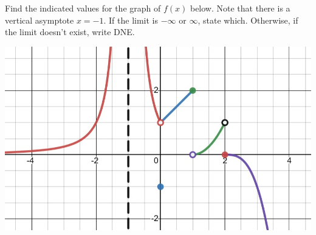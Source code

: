 \documentclass[11pt, addpoints]{exam}
\begin{document}
\begin{questions}

\clearpage

\question Find the indicated values for the graph of $f(x)$ below. Note that there is a vertical asymptote $x=-1$. If the limit is $-\infty$ or $\infty$, state which. Otherwise, if the limit doesn't exist, write DNE.
\vspace{0.25in}
\begin{center}
\includegraphics[scale=0.35]{Images/Sum23M241_MT1_pic2.jpeg}
\end{center}
\vspace{0.25in}
\begin{parts}
\end{parts}
\end{questions}
\end{document}
